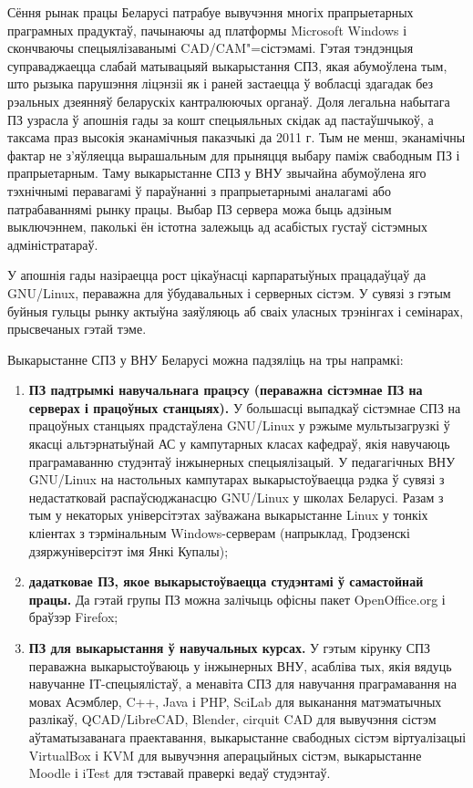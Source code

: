 \documentclass[10pt, a5paper]{article}
\begin{document}
Сёння рынак працы Беларусі патрабуе вывучэння многіх прапрыетарных праграмных
прадуктаў, пачынаючы ад платформы \linebreak Microsoft Windows і скончваючы спецыялізаванымі
CAD/CAM"=сістэмамі. Гэтая тэндэнцыя суправаджаецца слабай матывацыяй выкарыстання
СПЗ, якая абумоўлена тым, што рызыка парушэння ліцэнзіі як і раней застаецца ў
вобласці здагадак без рэальных дзеянняў беларускіх кантралюючых органаў. Доля
легальна набытага ПЗ узрасла ў апошнія гады за кошт спецыяльных скідак ад
пастаўшчыкоў, а таксама праз высокія эканамічныя паказчыкі да 2011 г. Тым не
менш, эканамічны фактар не з'яўляецца вырашальным для прыняцця выбару паміж
свабодным ПЗ і прапрыетарным. Таму выкарыстанне СПЗ у ВНУ звычайна абумоўлена
яго тэхнічнымі перавагамі ў параўнанні з прапрыетарнымі аналагамі або
патрабаваннямі рынку працы. Выбар ПЗ сервера можа быць адзіным выключэннем,
паколькі ён істотна залежыць ад асабістых густаў сістэмных адміністратараў.

У апошнія гады назіраецца рост цікаўнасці карпаратыўных працадаўцаў да GNU/Linux,
пераважна для ўбудавальных і серверных сістэм. У сувязі з гэтым буйныя гульцы
рынку актыўна заяўляюць аб сваіх уласных трэнінгах і семінарах, прысвечаных
гэтай тэме.

Выкарыстанне СПЗ у ВНУ Беларусі можна падзяліць на тры напрамкі:

\begin{enumerate}
  \item \textbf{ПЗ падтрымкі навучальнага працэсу (пераважна сістэмнае ПЗ на серверах
  і працоўных станцыях).} У большасці выпадкаў сістэмнае СПЗ на працоўных
  станцыях прадстаўлена GNU/Linux у рэжыме мультызагрузкі ў якасці альтэрнатыўнай
  АС у кампутарных класах кафедраў, якія навучаюць праграмаванню студэнтаў
  інжынерных спецыялізацый. У педагагічных ВНУ GNU/Linux на настольных кампутарах
  выкарыстоўваецца рэдка ў сувязі з недастатковай распаўсюджанасцю GNU/Linux у
  школах Беларусі. Разам з тым у некаторых універсітэтах заўважана выкарыстанне
  Linux у тонкіх кліентах з тэрмінальным Windows-серверам (напрыклад, Гродзенскі
  дзяржуніверсітэт імя Янкі Купалы);
  \item \textbf{дадатковае ПЗ, якое выкарыстоўваецца студэнтамі ў самастойнай працы.}
  Да гэтай групы ПЗ можна залічыць офісны пакет OpenOffice.org і браўзэр Firefox;
  \item \textbf{ПЗ для выкарыстання ў навучальных курсах.} У гэтым кірунку СПЗ
  пераважна выкарыстоўваюць у інжынерных \linebreak ВНУ, асабліва тых, якія вядуць
  навучанне ІТ-спецыялістаў, а менавіта СПЗ для навучання праграмавання на
  мовах Асэмблер, C++, Java і PHP, SciLab для выканання матэматычных разлікаў, QCAD/LibreCAD,
  Blender, cirquit CAD для вывучэння сістэм аўтаматызаванага праектавання, выкарыстанне
  свабодных сістэм віртуалізацыі VirtualBox і KVM для вывучэння аперацыйных сістэм,
  выкарыстанне Moodle і iTest для тэставай праверкі ведаў студэнтаў.
\end{enumerate}
\end{document}
